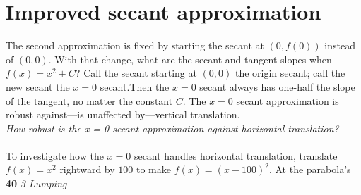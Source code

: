 \documentclass[a4paper, 12pt]{book}
\begin{document}
    \section{Improved secant approximation}
    The second approximation is fixed by starting the secant at $(0, f(0))$ instead of $(0, 0).$ With that change, what are the secant and tangent slopes when $f(x) = x^2 + C$? Call the secant starting at $(0, 0)$ the origin secant; call the new secant the $x = 0$ secant.Then the $x = 0$ secant always has one-half the slope of the tangent, no matter the constant $C$. The $x = 0$ secant approximation is robust against—is unaffected by—vertical translation.
    \\
    {\it How robust is the x = 0 secant approximation against horizontal translation?}\\
    \\
    To investigate how the $x = 0$ secant handles horizontal translation, translate
    $f(x) = x^2$ rightward by $100$ to make $f(x)=(x−100)^2$. At the parabola’s
    \newpage
    \noindent
    \large\textbf{40} \hfill \textit{3 Lumping} \\
\end{document}
